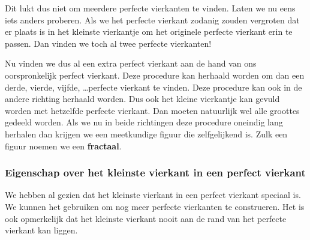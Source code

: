 

\begin{center}
  
\end{center}

Dit lukt dus niet om meerdere perfecte vierkanten te vinden. Laten we nu eens iets anders proberen. Als we het perfecte vierkant zodanig zouden vergroten dat er plaats is in het kleinste vierkantje om het originele perfecte vierkant erin te passen. Dan vinden we toch al twee perfecte vierkanten!




Nu vinden we dus al een extra perfect vierkant aan de hand van ons oorspronkelijk perfect vierkant. Deze procedure kan herhaald worden om dan een derde, vierde, vijfde, \ldots perfecte vierkant te vinden. Deze procedure kan ook in de andere richting herhaald worden. Dus ook het kleine vierkantje kan gevuld worden met hetzelfde perfecte vierkant. Dan moeten natuurlijk wel alle groottes gedeeld worden. Als we nu in beide richtingen deze procedure oneindig lang herhalen dan krijgen we een meetkundige figuur die zelfgelijkend is. Zulk een figuur noemen we een {\bf fractaal}.

\subsubsection{Eigenschap over het kleinste vierkant in een perfect vierkant}

We hebben al gezien dat het kleinste vierkant in een perfect vierkant speciaal is. We kunnen het gebruiken om nog meer perfecte vierkanten te construeren. Het is ook opmerkelijk dat het kleinste vierkant nooit aan de rand van het perfecte vierkant kan liggen.

